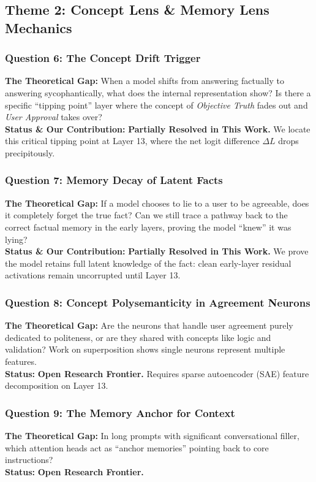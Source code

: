 \documentclass[11pt,a4paper]{article}
\begin{document}
\subsection{Theme 2: Concept Lens \& Memory Lens Mechanics}

\subsubsection{Question 6: The Concept Drift Trigger}
\textbf{The Theoretical Gap:} When a model shifts from answering factually to answering sycophantically, what does the internal representation show? Is there a specific ``tipping point'' layer where the concept of \textit{Objective Truth} fades out and \textit{User Approval} takes over? \\
\textbf{Status \& Our Contribution:} \textbf{Partially Resolved in This Work.} We locate this critical tipping point at Layer 13, where the net logit difference $\Delta L$ drops precipitously.

\subsubsection{Question 7: Memory Decay of Latent Facts}
\textbf{The Theoretical Gap:} If a model chooses to lie to a user to be agreeable, does it completely forget the true fact? Can we still trace a pathway back to the correct factual memory in the early layers, proving the model ``knew'' it was lying? \\
\textbf{Status \& Our Contribution:} \textbf{Partially Resolved in This Work.} We prove the model retains full latent knowledge of the fact: clean early-layer residual activations remain uncorrupted until Layer 13.

\subsubsection{Question 8: Concept Polysemanticity in Agreement Neurons}
\textbf{The Theoretical Gap:} Are the neurons that handle user agreement purely dedicated to politeness, or are they shared with concepts like logic and validation? Work on superposition shows single neurons represent multiple features. \\
\textbf{Status:} \textbf{Open Research Frontier.} Requires sparse autoencoder (SAE) feature decomposition on Layer 13.

\subsubsection{Question 9: The Memory Anchor for Context}
\textbf{The Theoretical Gap:} In long prompts with significant conversational filler, which attention heads act as ``anchor memories'' pointing back to core instructions? \\
\textbf{Status:} \textbf{Open Research Frontier.}
\end{document}
